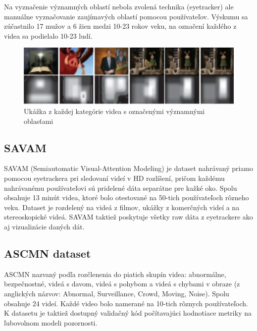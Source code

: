 Na vyznačenie významných oblastí nebola zvolená technika (eyetracker) ale manuálne vyznačovanie zaujímavých oblastí pomocou používateľov.
Výskumu sa zúčastnilo 17 mužov a 6 žien medzi 10-23 rokov veku, na označení každého z videa sa podielalo 10-23 ludí.

\begin{figure}[H]
 \centering
 \includegraphics[width=12cm]{pics/rsd.png}
 \caption{Ukážka z každej kategórie videa s označenými významnými oblasťami}
\end{figure}
\vspace{10mm}

\subsection{SAVAM}
SAVAM (Semiautomatic Visual-Attention Modeling) je dataset nahrávaný priamo pomocou eyetrackera pri sledovaní videí v HD rozlíšení, pričom každému nahrávanému používateľovi sú pridelené dáta separátne pre kažké oko.
Spolu obsahuje 13 minút videa, ktoré bolo otestované na 50-tich používateľoch rôzneho veku.
Dataset je rozdelený na videá z filmov, ukážky z komerčných videí a na stereoskopické videá.
SAVAM taktiež poskytuje všetky raw dáta z eyetrackere ako aj vizualizácie daných dát\cite{savam}.

\subsection{ASCMN dataset}
ASCMN nazvaný podľa rozčlenenia do piatich skupín videa: abnormálne, bezpečnostné, videá s davom, videá s pohybom a videá s chybami v obraze (z anglických názvov: Abnormal, Surveillance, Crowd, Moving, Noise).
Spolu obsahuje 24 videí.
Každé video bolo namerané na 10-tich rôznych používateľoch.
K datasetu je taktiež dostupný validačný kód\cite{accv} počítavajúci hodnotiace metriky na ľubovolnom modeli pozornosti.

